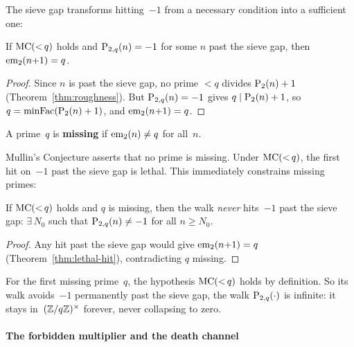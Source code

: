 \noindent The sieve gap transforms hitting~$-1$ from a necessary condition into
a sufficient one:

\begin{theorem}\label{thm:lethal-hit}
If $\mathrm{MC}({<}\,q)$ holds and $\mathrm{P}_{2,q}(n) = -1$ for some $n$ past the
sieve gap, then $\mathrm{em}_{2}(n{+}1) = q$.
\end{theorem}

\begin{proof}
Since $n$ is past the sieve gap, no prime $< q$ divides
$\mathrm{P}_{2}(n)+1$ (Theorem~\ref{thm:roughness}).  But $\mathrm{P}_{2,q}(n) = -1$
gives $q \mid \mathrm{P}_{2}(n)+1$, so $q = \mathrm{minFac}(\mathrm{P}_{2}(n)+1)$, and
$\mathrm{em}_{2}(n{+}1) = q$.
\end{proof}

\begin{definition}\label{def:missing}
A prime~$q$ is \textbf{missing} if $\mathrm{em}_{2}(n) \neq q$ for all~$n$.
\end{definition}

\noindent Mullin's Conjecture asserts that no prime is missing.
Under $\mathrm{MC}({<}\,q)$, the first hit on~$-1$ past the sieve gap is
lethal.  This immediately constrains missing primes:

\begin{theorem}\label{thm:no-cofinal-hit}
If $\mathrm{MC}({<}\,q)$ holds and $q$ is missing, then the walk \emph{never}
hits~$-1$ past the sieve gap: $\exists\, N_0$ such that
$\mathrm{P}_{2,q}(n) \neq -1$ for all $n \geq N_0$.
\end{theorem}

\begin{proof}
Any hit past the sieve gap would give $\mathrm{em}_{2}(n{+}1) = q$
(Theorem~\ref{thm:lethal-hit}), contradicting $q$ missing.
\end{proof}

\noindent For the first missing prime~$q$, the hypothesis $\mathrm{MC}({<}\,q)$ holds
by definition.  So its walk avoids~$-1$ permanently past the sieve
gap, the walk $\mathrm{P}_{2,q}(\cdot)$ is infinite: it stays
in~$(\mathbb{Z}/q\mathbb{Z})^\times$ forever, never collapsing to zero.

\paragraph{The forbidden multiplier and the death channel}

